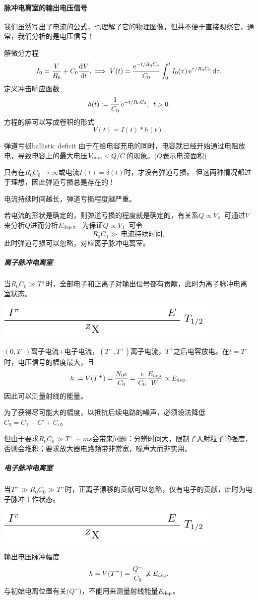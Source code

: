 \paragraph{脉冲电离室的输出电压信号}
我们虽然写出了电流的公式，也理解了它的物理图像，但并不便于直接观察它，通常，我们分析的是电压信号！

解微分方程
\[
	I_0=\frac V{R_0}+C_0\frac{\mathrm{d}^{{}}V}{\mathrm{d}{t}^{{}}},\implies V(t)=\frac{\mathop{}\!\mathrm{e}^{-t/R_0C_0}}{C_0}\int_0^tI_0(\tau)\mathop{}\!\mathrm{e}^{\tau/R_0C_0}\mathop{}\!\mathrm{d}\tau.
\]
定义冲击响应函数
\[
	h(t):=\frac1{C_0}\mathop{}\!\mathrm{e}^{-t/R_0C_0},\enspace t>0.
\]
方程的解可以写成卷积的形式
\[
	V(t)=I(t)\ast h(t).
\]
\begin{definition}{弹道亏损}{ballistic deficit}
	由于在给电容充电的同时，电容就已经开始通过电阻放电，导致电容上的最大电压$V_\mathrm{max}<Q/C$的现象。($Q$表示电流面积)
\end{definition}
只有在$R_0C_0\to\infty$或电流$I(t)=\delta(t)$时，才没有弹道亏损。
但这两种情况都过于理想，因此弹道亏损总是存在的！

电流持续时间越长，弹道亏损程度越严重。%

若电流的形状是确定的，则弹道亏损的程度就是确定的，有关系$Q\propto V$，可通过$V$来分析$Q$进而分析$E_{\mathrm{dep}}$。
为保证$Q\propto V$，可令
\[
	R_0C_0\gg~\text{电流持续时间},
\]
此时弹道亏损可以忽略，对应离子脉冲电离室。
\subparagraph{离子脉冲电离室}
当$R_0C_0\gg T^+$时，全部电子和正离子对输出信号都有贡献，此时为离子脉冲电离室状态。
\begin{center}
	\includegraphics[page=18]{figures/tikz/layouts.pdf}
\end{center}
$(0,T^-)$离子电流+电子电流，$(T^-,T^+)$离子电流，$T^+$之后电容放电。在$t=T^+$时，电压信号的幅度最大，且
\begin{align}
	h:=V(T^+)=\frac{N_0e}{C_0}=\frac{e}{C_0}\frac{E_{\mathrm{dep}}}W\propto E_{\mathrm{dep}}.
\end{align}
因此可以测量射线的能量。

为了获得尽可能大的幅度，以抵抗后续电路的噪声，必须设法降低$C_0=C_1+C'+C_i$。

但由于要求$R_0C_0\gg T^+\sim\si{ms}$会带来问题：分辨时间大，限制了入射粒子的强度，否则会堆积；要求放大器电路频带非常宽，噪声大而非实用。
\subparagraph{电子脉冲电离室}
当$T^+\gg R_0C_0\gg T^-$时，正离子漂移的贡献可以忽略，仅有电子的贡献，此时为电子脉冲工作状态。
\begin{center}
	\includegraphics[page=19]{figures/tikz/layouts.pdf}
\end{center}
输出电压脉冲幅度
\[
	h=V(T^-)=\frac{Q^-}{C_0}\not\propto E_{\mathrm{dep}}.
\]
与初始电离位置有关($Q^-$)，不能用来测量射线能量$E_{\mathrm{dep}}$。

